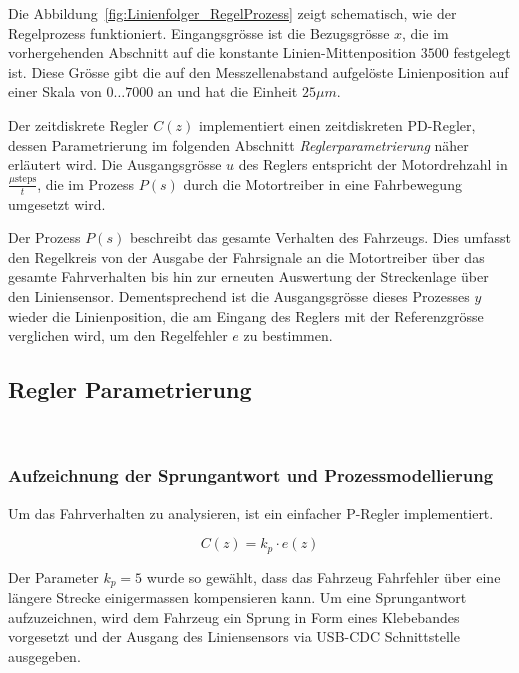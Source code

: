 \documentclass[main.tex]{subfiles} %
\begin{document}
Die Abbildung~\ref{fig:Linienfolger_RegelProzess} zeigt schematisch, wie der
Regelprozess funktioniert. Eingangsgrösse ist die Bezugsgrösse $x$, die im
vorhergehenden Abschnitt auf die konstante Linien-Mittenposition $3500$
festgelegt ist. Diese Grösse gibt die auf den Messzellenabstand aufgelöste
Linienposition auf einer Skala von $0 \dots 7000$ an und hat die Einheit $25\mu
    m$.

Der zeitdiskrete Regler $C(z)$ implementiert einen zeitdiskreten PD-Regler,
dessen Parametrierung im folgenden Abschnitt \textit{Reglerparametrierung}
näher erläutert wird. Die Ausgangsgrösse $u$ des Reglers entspricht der
Motordrehzahl in $\frac{\mu \text{steps}}{t}$, die im Prozess $P(s)$ durch die
Motortreiber in eine Fahrbewegung umgesetzt wird.

Der Prozess $P(s)$ beschreibt das gesamte Verhalten des Fahrzeugs. Dies umfasst
den Regelkreis von der Ausgabe der Fahrsignale an die Motortreiber über das
gesamte Fahrverhalten bis hin zur erneuten Auswertung der Streckenlage über den
Liniensensor. Dementsprechend ist die Ausgangsgrösse dieses Prozesses $y$
wieder die Linienposition, die am Eingang des Reglers mit der Referenzgrösse
verglichen wird, um den Regelfehler $e$ zu bestimmen.

\subsection*{Regler Parametrierung}~\label{apdx:Regler_Parametrierung}

\subsubsection*{Aufzeichnung der Sprungantwort und Prozessmodellierung}

Um das Fahrverhalten zu analysieren, ist ein einfacher P-Regler implementiert.

\[
    C(z) = k_p \cdot e(z)
\]

Der Parameter $k_p = 5$ wurde so gewählt, dass das Fahrzeug Fahrfehler über
eine längere Strecke einigermassen kompensieren kann. Um eine Sprungantwort
aufzuzeichnen, wird dem Fahrzeug ein Sprung in Form eines Klebebandes
vorgesetzt und der Ausgang des Liniensensors via USB-CDC Schnittstelle
ausgegeben.
\end{document}
